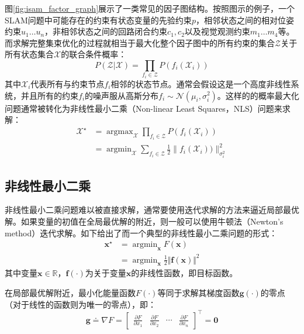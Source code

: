 图\ref{fig:isam_factor_graph}展示了一类常见的因子图结构。按照图示的例子，一个SLAM问题中可能存在的约束有状态变量的先验约束$p$，相邻状态之间的相对位姿约束$u_1 \dots u_n$，非相邻状态之间的回路闭合约束$c_1,c_2$以及视觉观测约束$m_1 \dots m_4$等。而求解完整集束优化的过程就相当于最大化整个因子图中的所有约束的集合$\mathcal{Z}$关于所有状态集合$\mathcal{X}$的联合条件概率：
\begin{equation}
    P(\mathcal{Z}|\mathcal{X}) = \prod_{f_i\in\mathcal{Z}} P(f_i(\mathcal{X}_i))
\end{equation}
其中$\mathcal{X}_i$代表所有与约束节点$f_i$相邻的状态节点。通常会假设这是一个高度非线性系统，并且所有的约束$f_i$的噪声服从高斯分布$f_i\sim\mathcal{N}(\mu_i, \sigma_i^2)$。这样的的概率最大化问题通常被转化为非线性最小二乘（Non-linear Least Squares，NLS）问题来求解：
\begin{equation}
\begin{aligned}
    \mathcal{X}^\star &= \mathop{\arg\max}_{\mathcal{X}}
                         \prod_{f_i\in\mathcal{Z}} P(f_i(\mathcal{X}_i)) \\
                      &= \mathop{\arg\min}_{\mathcal{X}}
                         \sum_{f_i\in\mathcal{Z}} \frac{1}{2}
                         \lVert f_i(\mathcal{X}_i)) \rVert_{\sigma_i^2}^2
\end{aligned}
\end{equation}

\subsection{非线性最小二乘}

非线性最小二乘问题难以被直接求解，通常要使用迭代求解的方法来逼近局部最优解。如果变量的初值在全局最优解的附近，则一般可以使用牛顿法（Newton's method）迭代求解。如下给出了而一个典型的非线性最小二乘问题的形式：
\begin{equation}
\begin{aligned}
    \bm{x}^\star &= \mathop{\arg\min}_{\bm{x}} F(\bm{x}) \\
                 &= \mathop{\arg\min}_{\bm{x}}
                    \frac{1}{2} \Vert \mathbf{f}(\bm{x}) \Vert^2
\end{aligned}\label{eq:nlls}
\end{equation}
其中变量$\bm{x}\in\mathbb{R}$，$\mathbf{f}(\cdot)$为关于变量$\bm{x}$的非线性函数，即目标函数。

在局部最优解附近，最小化能量函数$F(\cdot)$等同于求解其梯度函数$\bm{g}(\cdot)$的零点（对于线性的函数则为唯一的零点），即：
\begin{equation}
    \bm{g} \doteq \nabla F = \begin{bmatrix}
        \frac{\partial F}{\partial x_1} &
        \frac{\partial F}{\partial x_2} &
        \cdots &
        \frac{\partial F}{\partial x_n}
    \end{bmatrix}^\top = \bm{0}
\end{equation}

